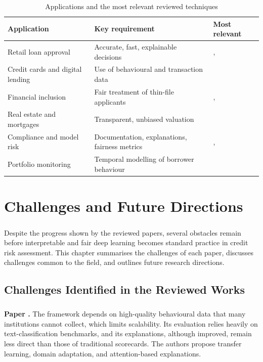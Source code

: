 \documentclass[12pt,a4paper,final]{extreport}
\begin{document}
{\renewcommand{\arraystretch}{1.2}
\begin{table}[htbp]
\centering
\caption{Applications and the most relevant reviewed techniques}\label{tab:apps}
\small
\begin{tabularx}{\textwidth}{|p{4.2cm}|X|p{2.6cm}|}
\hline
\textbf{Application} & \textbf{Key requirement} & \textbf{Most relevant} \\ \hline
Retail loan approval & Accurate, fast, explainable decisions & \cite{p2}, \cite{p3} \\ \hline
Credit cards and digital lending & Use of behavioural and transaction data & \cite{p1} \\ \hline
Financial inclusion & Fair treatment of thin-file applicants & \cite{p1}, \cite{p4} \\ \hline
Real estate and mortgages & Transparent, unbiased valuation & \cite{p4} \\ \hline
Compliance and model risk & Documentation, explanations, fairness metrics & \cite{p3}, \cite{p4} \\ \hline
Portfolio monitoring & Temporal modelling of borrower behaviour & \cite{p1} \\ \hline
\end{tabularx}
\end{table}}

\chapter{Challenges and Future Directions}

\paragraph{} Despite the progress shown by the reviewed papers, several obstacles remain before interpretable and fair deep learning becomes standard practice in credit risk assessment. This chapter summarises the challenges of each paper, discusses challenges common to the field, and outlines future research directions.

\section{Challenges Identified in the Reviewed Works}

\paragraph{} \textbf{Paper \cite{p1}.} The framework depends on high-quality behavioural data that many institutions cannot collect, which limits scalability. Its evaluation relies heavily on text-classification benchmarks, and its explanations, although improved, remain less direct than those of traditional scorecards. The authors propose transfer learning, domain adaptation, and attention-based explanations.
\end{document}
